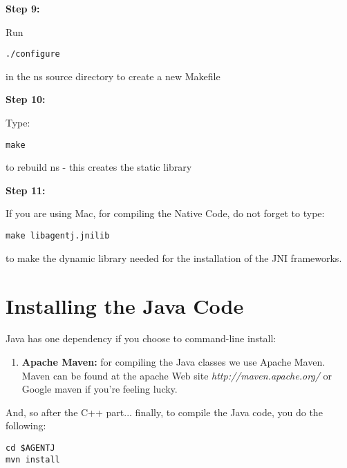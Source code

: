 \vspace{0.1in}

\noindent \textbf{Step 9:}

Run 
\footnotesize
\begin{verbatim}
./configure 
\end{verbatim}
\normalsize

\noindent in the ns source directory to create a new Makefile 

\vspace{0.1in}

\noindent \textbf{Step 10:}

Type:

\footnotesize
\begin{verbatim}
make
\end{verbatim}
\normalsize

\noindent  to rebuild ns - this creates the static library
      
\vspace{0.1in}

\noindent \textbf{Step 11:}

If you are using Mac, for compiling the Native Code, do not forget to type:

\footnotesize
\begin{verbatim}
make libagentj.jnilib
\end{verbatim}
\normalsize

 \noindent to make the dynamic library  needed for the installation of the JNI frameworks.


\section{Installing the Java Code}
\label{sec:installjava}


Java has one dependency if you choose to command-line install:

\begin{enumerate}
\item \textbf{Apache Maven:} for compiling the Java classes we use Apache Maven. Maven can be found at the apache Web site \emph{http://maven.apache.org/} or Google maven if you're feeling lucky.
\end{enumerate}
 
And, so after the C++ part... finally, to compile the Java code, you do the following:

\footnotesize
\begin{verbatim}
cd $AGENTJ
mvn install
\end{verbatim}
\normalsize


